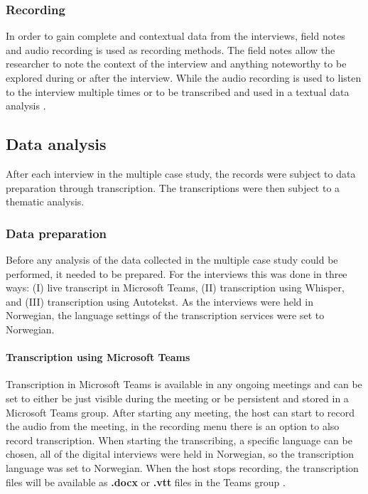 \subsubsection{Recording}
In order to gain complete and contextual data from the interviews, field notes and audio recording is used as recording methods. The field notes allow the researcher to note the context of the interview and anything noteworthy to be explored during or after the interview. While the audio recording is used to listen to the interview multiple times or to be transcribed and used in a textual data analysis \cite{bjo_2022}.

\subsection{Data analysis}
After each interview in the multiple case study, the records were subject to data preparation through transcription. The transcriptions were then subject to a thematic analysis.

\subsubsection{Data preparation}
Before any analysis of the data collected in the multiple case study could be performed, it needed to be prepared. For the interviews this was done in three ways: (I) live transcript in Microsoft Teams, (II) transcription using Whisper, and (III) transcription using Autotekst. As the interviews were held in Norwegian, the language settings of the transcription services were set to Norwegian. 

\paragraph{Transcription using Microsoft Teams}
Transcription in Microsoft Teams is available in any ongoing meetings and can be set to either be just visible during the meeting or be persistent and stored in a Microsoft Teams group. After starting any meeting, the host can start to record the audio from the meeting, in the recording menu there is an option to also record transcription. When starting the transcribing, a specific language can be chosen, all of the digital interviews were held in Norwegian, so the transcription language was set to Norwegian. When the host stops recording, the transcription files will be available as \textbf{.docx} or \textbf{.vtt} files in the Teams group \cite{mt_2022}.


